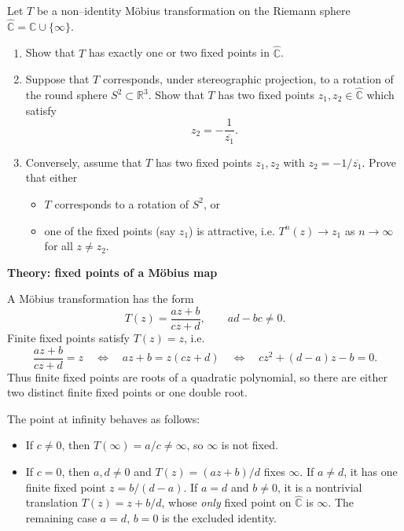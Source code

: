 \begin{problem}
\label{prob:cp-vii-0086}
Let $T$ be a non--identity M\"obius transformation on the Riemann sphere
$\widehat{\mathbb{C}} = \mathbb{C}\cup\{\infty\}$.

\begin{enumerate}
	\item Show that $T$ has exactly one or two fixed points in
	$\widehat{\mathbb{C}}$.
	\item Suppose that $T$ corresponds, under stereographic projection, to a
	rotation of the round sphere $S^{2}\subset\mathbb{R}^{3}$.  Show that
	$T$ has two fixed points $z_{1},z_{2}\in\widehat{\mathbb{C}}$ which
	satisfy
	\[
	z_{2} = -\frac{1}{\overline{z_{1}}}.
	\]
	\item Conversely, assume that $T$ has two fixed points $z_{1},z_{2}$ with
	$z_{2} = -1/\overline{z_{1}}$.  Prove that either
	\begin{itemize}
		\item $T$ corresponds to a rotation of $S^{2}$, or
		\item one of the fixed points (say $z_{1}$) is attractive, i.e.
		$T^{n}(z)\to z_{1}$ as $n\to\infty$ for all
		$z\neq z_{2}$.
	\end{itemize}
\end{enumerate}

\par\medskip\noindent\textbf{Theory: fixed points of a M\"obius map}\par\smallskip


A M\"obius transformation has the form
\[
T(z) = \frac{az+b}{cz+d}, \qquad ad-bc\neq 0.
\]
Finite fixed points satisfy $T(z)=z$, i.e.
\[
\frac{az+b}{cz+d} = z
\quad\Longleftrightarrow\quad
az+b = z(cz+d)
\quad\Longleftrightarrow\quad
cz^{2} + (d-a)z - b = 0.
\]
Thus finite fixed points are roots of a quadratic polynomial, so there are
either two distinct finite fixed points or one double root.

The point at infinity behaves as follows:

\begin{itemize}
	\item If $c\neq 0$, then $T(\infty)=a/c\neq\infty$, so $\infty$ is not fixed.
	\item If $c=0$, then $a,d\ne0$ and
	$T(z)=(az+b)/d$ fixes $\infty$.
	If $a\ne d$, it has one finite fixed point
	$z=b/(d-a)$.  If $a=d$ and $b\ne0$, it is a nontrivial
	translation $T(z)=z+b/d$, whose \emph{only} fixed point on
	$\widehat{\mathbb C}$ is $\infty$.  The remaining case
	$a=d$, $b=0$ is the excluded identity.
\end{itemize}


\end{problem}
